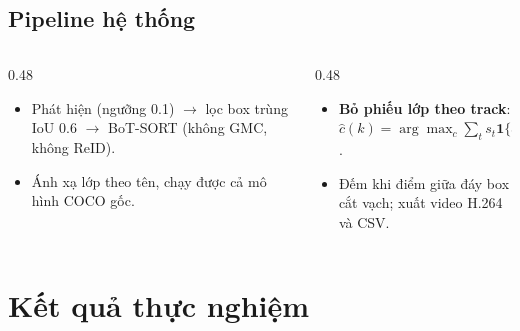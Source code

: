 \documentclass[aspectratio=\mlwAspectRatio, \mlwBaseSize, t]{beamer}
\begin{document}
\subsection{Pipeline hệ thống}
\begin{frame}{\stitle}
  \centering
  \vspace{0.3em}
  \begin{columns}[T]
    \begin{column}{0.48\textwidth}
      \begin{itemize}
        \item Phát hiện (ngưỡng 0.1) $\rightarrow$ \alert{lọc box trùng} IoU 0.6 $\rightarrow$ BoT-SORT (không GMC, không
              ReID).
        \item Ánh xạ lớp theo tên, chạy được cả mô hình COCO gốc.
      \end{itemize}
    \end{column}
    \begin{column}{0.48\textwidth}
      \begin{itemize}
        \item \textbf{Bỏ phiếu lớp theo track}: $\hat{c}(k) = \arg\max_c \sum_{t} s_t \mathbf{1}\{c_t = c\}$.
        \item Đếm khi điểm giữa đáy box cắt vạch; xuất video H.264 và CSV.
      \end{itemize}
    \end{column}
  \end{columns}
\end{frame}

\section{Kết quả thực nghiệm}
\end{document}
